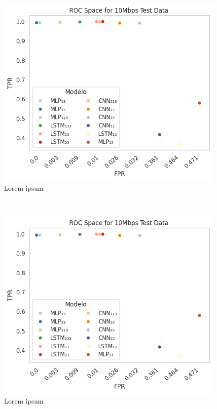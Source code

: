 \begin{subfigure}{0.25\textwidth}
	\centering
	\includegraphics[width=1.0\textwidth]{./figs/ROC-Space-Test-Data-10Mbps.png}
	\caption{Lorem ipsum}
\end{subfigure}
~ 
\begin{subfigure}{0.25\textwidth}
	\centering
	\includegraphics[width=1.0\textwidth]{./figs/ROC-Space-Test-Data-10Mbps.png}
	\caption{Lorem ipsum}
\end{subfigure}
~ 
